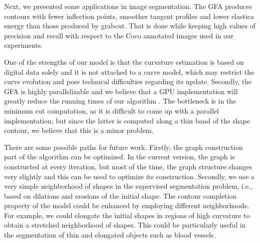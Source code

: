 \documentclass{siamart220329}
\begin{document}
Next, we presented some applications in image
segmentation. The GFA produces contours with
fewer inflection points, smoother tangent profiles and lower elastica energy
than those produced by grabcut. That is done while
keeping high values of precision and recall with respect to the Coco annotated
images used in our experiments. 

One of the strengths of our model is that the curvature estimation is based on
digital data solely and it is not attached to a curve model, which may restrict
the curve evolution and pose technical difficulties regarding its update.
Secondly, the GFA is highly parallelizable and we believe
that a GPU implementation will greatly reduce the running times of our algorithm
. The bottleneck is in the
minimum cut computation, as it is difficult to come up with a parallel
implementation, but since the latter is computed along a thin band of the shape
contour, we believe that this is a minor problem.

There are some possible paths for future work. Firstly, the graph construction
part of the algorithm can be optimized. In the current version, the graph is
constructed at every iteration, but most of the time, the graph structure
changes very slightly and this can be used to optimize its construction.
Secondly, we use a very simple neighborhood of shapes in the supervised
segmentation problem, i.e., based on dilations and erosions of the initial
shape. The contour completion property of the model could be enhanced by
employing different neighborhoods. For example, we could elongate the initial
shapes in regions of high curvature to obtain a stretched neighborhood of
shapes. This could be particularly useful in the segmentation of thin and
elongated objects such as blood vessels.
%
%
%
%


\end{document}
